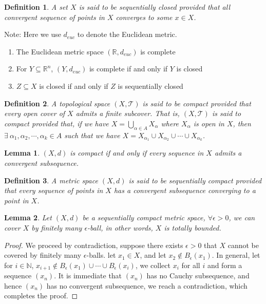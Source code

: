 \documentclass[15pt]{book}
\theoremstyle{break}
\theoremstyle{break}
\newtheorem{lem}{Lemma}[thm]
\newtheorem{defn}{Definition}[corL]
\newcommand{\R}{\mathbb{R}}
\newcommand{\N}{\mathbb{N}}
\newcommand{\T}{\mathcal{T}}
\newcommand{\note}{\color{red}Note: \color{black}}
\begin{document}
\begin{defn}
A set $X$ is said to be sequentially closed provided that all convergent sequence of points in $X$ converges to some $x \in X$.
\end{defn}

\note Here we use $d_{euc}$ to denote the Euclidean metric.
\begin{enumerate}[topsep=3pt,itemsep=-1ex,partopsep=1ex,parsep=1ex]
\item The Euclidean metric space $(\R,d_{euc})$ is complete
\item For $Y \subseteq \R^n$, $(Y,d_{euc})$ is complete if and only if $Y$ is closed
\item $Z \subseteq X$ is closed if and only if $Z$ is sequentially closed 
\end{enumerate}

\begin{defn}
A topological space $(X,\T)$ is said to be compact provided that every open cover of $X$ admits a finite subcover. That is, $(X,\T)$ is said to compact provided that, if we have $X = \bigcup_{\alpha \in A} X_{\alpha}$ where $X_\alpha$ is open in $X$, then $\exists\ \alpha_1,\alpha_2,\cdots,\alpha_k \in A$ such that we have $X =  X_{\alpha_1}\cup X_{\alpha_2}\cup\cdots\cup X_{\alpha_k}$.
\end{defn}

\begin{lem}
$(X,d)$ is compact if and only if every sequence in $X$ admits a convergent subsequence. \end{lem}

\begin{defn}
A metric space $(X,d)$ is said to be sequentially compact provided that every sequence of points in $X$ has a convergent subsequence converging to a point in $X$.
\end{defn}

\begin{lem}
Let $(X,d)$ be a sequentially compact metric space, $\forall \epsilon >0$, we can cover $X$ by finitely many $\epsilon$-ball, in other words, $X$ is totally bounded.
\end{lem}
\begin{proof}
We proceed by contradiction, suppose there exists $\epsilon >0$ that $X$ cannot be covered by finitely many $\epsilon$-balls. let $x_1 \in X$, and let $x_2\notin B_\epsilon (x_1)$. In general, let for $i \in \N$, $x_{i+1}\notin B_\epsilon (x_1)\cup\cdots\cup B_\epsilon (x_i)$, we collect $x_i$ for all $i$ and form a sequence $(x_n)$. It is immediate that $(x_n)$ has no Cauchy subsequence, and hence $(x_n)$ has no convergent subsequence, we reach a contradiction, which completes the proof.
\end{proof}
\end{document}
